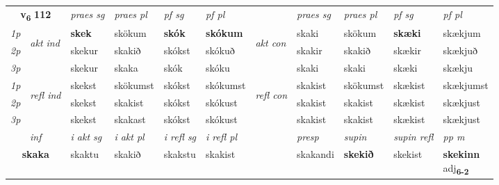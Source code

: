 \noindent
\begin{tabular}{lllllllllll} \toprule
\multicolumn{2}{c}{\textbf{v{\textsubscript{6}}} \Large{\textbf{112}}}  &  \textit{praes sg}  & \textit{praes pl}  &\textit{ pf sg} & \textit{pf pl} &  &  \textit{praes sg}  & \textit{praes pl}  & \textit{pf sg} & \textit{pf pl } \\*
	\cmidrule{3-6} \cmidrule{8-11}
 {\textit{1p}} & \multirow{3}{*}{\begin{turn}{90}\textit{akt ind}\end{turn}} & \textbf{skek} & skökum & \textbf{skók} & \textbf{skókum} & \multirow{3}{*}{\begin{turn}{90}\textit{akt con}\end{turn}} &skaki & skökum & \textbf{skæki} & skækjum\\*
 {\textit{2p}} &  &  skekur  & skakið & skókst & skókuð & & skakir & skakið & skækir & skækjuð \\*
{\textit{3p}} &  & skekur & skaka & skók & skóku & & skaki & skaki& skæki & skækju \\*
\cmidrule{3-6} \cmidrule{8-11}
 {\textit{1p}} & \multirow{3}{*}{\begin{turn}{90}\textit{refl ind}\end{turn}}  & skekst & skökumst & skókst & skókumst & \multirow{3}{*}{\begin{turn}{90}\textit{refl con}\end{turn}}  &skakist & skökumst & skækist & skækjumst \\*
 {\textit{2p}} &  & skekst & skakist & skókst & skókust & &skakist & skakist & skækist & skækjust \\*
 {\textit{3p}}  & & skekst & skakast & skókst & skókust & & skakist & skakist& skækist & skækjust \\*
\cmidrule{3-6} \cmidrule{8-11}

   \multicolumn{2}{c}{\textit{inf}}  & \textit{i akt sg} & \textit{i akt pl} & \textit{i refl sg} & \textit{i refl pl} && \textit{presp} & \textit{supin} & \textit{supin refl} & \textit{pp m} \\*
  \multicolumn{2}{c}{\textbf{skaka}} & skaktu  & skakið & skakstu & skakist && skakandi &  \textbf{skekið} & skekist & \specialcell{\textbf{skekinn} \\ adj\textbf{\textsubscript{6-2}}} \\*
\end{tabular}


